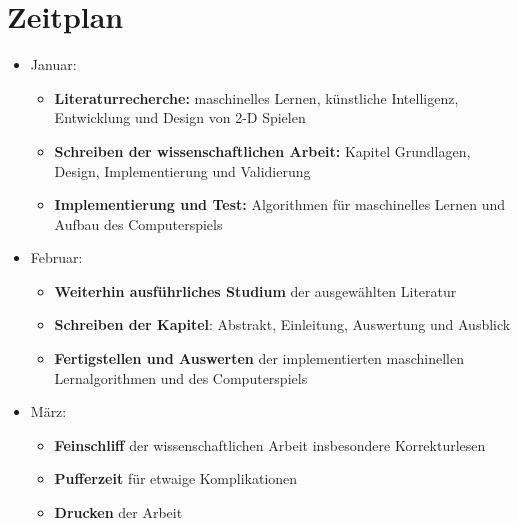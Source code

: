 \documentclass[12pt,a4paper]{scrartcl}
\begin{document}
\section*{Zeitplan}
\begin{itemize}
	\item Januar:
	\begin{itemize}
		\item \textbf{Literaturrecherche:} maschinelles Lernen, künstliche Intelligenz, Entwicklung und Design von 2-D Spielen
		\item \textbf{Schreiben der wissenschaftlichen Arbeit:} Kapitel Grundlagen, Design, Implementierung und Validierung
		\item \textbf{Implementierung und Test:} Algorithmen für maschinelles Lernen und Aufbau des Computerspiels
	\end{itemize}
	\item Februar:
	\begin{itemize}
		\item \textbf{Weiterhin ausführliches Studium} der ausgewählten Literatur
		\item \textbf{Schreiben der Kapitel}: Abstrakt, Einleitung, Auswertung und Ausblick
		\item \textbf{Fertigstellen und Auswerten} der implementierten maschinellen Lernalgorithmen und des Computerspiels
	\end{itemize}
	\item März:
	\begin{itemize}
		\item \textbf{Feinschliff} der wissenschaftlichen Arbeit insbesondere Korrekturlesen
		\item \textbf{Pufferzeit} für etwaige Komplikationen
		\item \textbf{Drucken} der Arbeit
	\end{itemize}
\end{itemize}
\end{document}
